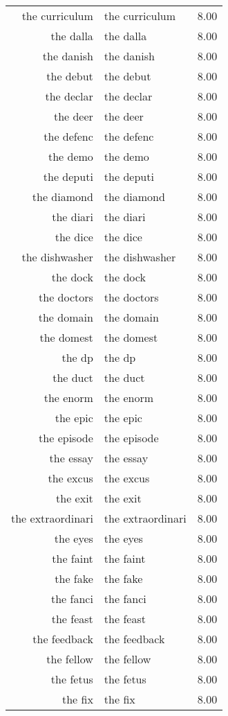 \begin{table}[ht]
\begin{tabular}{rlr}
  the curriculum & the curriculum & 8.00 \\ 
  the dalla & the dalla & 8.00 \\ 
  the danish & the danish & 8.00 \\ 
  the debut & the debut & 8.00 \\ 
  the declar & the declar & 8.00 \\ 
  the deer & the deer & 8.00 \\ 
  the defenc & the defenc & 8.00 \\ 
  the demo & the demo & 8.00 \\ 
  the deputi & the deputi & 8.00 \\ 
  the diamond & the diamond & 8.00 \\ 
  the diari & the diari & 8.00 \\ 
  the dice & the dice & 8.00 \\ 
  the dishwasher & the dishwasher & 8.00 \\ 
  the dock & the dock & 8.00 \\ 
  the doctors & the doctors & 8.00 \\ 
  the domain & the domain & 8.00 \\ 
  the domest & the domest & 8.00 \\ 
  the dp & the dp & 8.00 \\ 
  the duct & the duct & 8.00 \\ 
  the enorm & the enorm & 8.00 \\ 
  the epic & the epic & 8.00 \\ 
  the episode & the episode & 8.00 \\ 
  the essay & the essay & 8.00 \\ 
  the excus & the excus & 8.00 \\ 
  the exit & the exit & 8.00 \\ 
  the extraordinari & the extraordinari & 8.00 \\ 
  the eyes & the eyes & 8.00 \\ 
  the faint & the faint & 8.00 \\ 
  the fake & the fake & 8.00 \\ 
  the fanci & the fanci & 8.00 \\ 
  the feast & the feast & 8.00 \\ 
  the feedback & the feedback & 8.00 \\ 
  the fellow & the fellow & 8.00 \\ 
  the fetus & the fetus & 8.00 \\ 
  the fix & the fix & 8.00 \\ 

\end{tabular}
\end{table}

